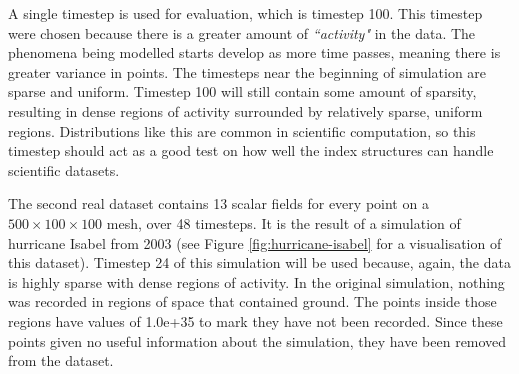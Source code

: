A single timestep is used for evaluation, which is timestep 100. This timestep were chosen because there is a greater amount of \textit{``activity"} in the data. The phenomena being modelled starts develop as more time passes, meaning there is greater variance in points. The timesteps near the beginning of simulation are sparse and uniform. Timestep 100 will still contain some amount of sparsity, resulting in dense regions of activity surrounded by relatively sparse, uniform regions. Distributions like this are common in scientific computation, so this timestep should act as a good test on how well the index structures can handle scientific datasets.

The second real dataset contains 13 scalar fields for every point on a $500 \times 100 \times 100$ mesh, over 48 timesteps. It is the result of a simulation of hurricane Isabel from 2003 \cite{hurricane-isabel-dataset} (see Figure \ref{fig:hurricane-isabel} for a visualisation of this dataset). Timestep 24 of this simulation will be used because, again, the data is highly sparse with dense regions of activity. In the original simulation, nothing was recorded in regions of space that contained ground. The points inside those regions have values of 1.0e+35 to mark they have not been recorded. Since these points given no useful information about the simulation, they have been removed from the dataset.

